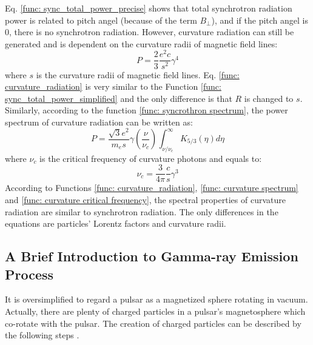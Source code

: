 \documentclass[12pt]{report}
\begin{document}
          Eq. \ref{func: sync_total_power_precise} shows that total synchrotron radiation power 
          is related to pitch angel (because of the term $B_\perp$), and if the pitch angel is $0$, there is 
          no synchrotron radiation. However, curvature radiation can still be generated and is dependent on 
          the curvature radii of magnetic field lines:
          \begin{equation}
            \label{func: curvature_radiation}
            P = \frac{2}{3}\frac{e^2c}{s^2}\gamma^4
          \end{equation}
          where $s$ is the curvature radii of magnetic field lines. 
          Eq. \ref{func: curvature_radiation} is very similar to the Function 
          \ref{func: sync_total_power_simplified} and the only difference is that $R$ is changed to $s$.
          Similarly, according to the function \ref{func: syncrothron spectrum}, 
          the power spectrum of curvature radiation can be written as:
          \begin{equation}
            \label{func: curvature spectrum}
            P = \frac{\sqrt{3}e^2}{m_es}\gamma \left(\frac{\nu}{\nu_c}\right) \int_{\nu / \nu_c}^{\infty} K_{5/3}\left(\eta \right)d\eta
          \end{equation}
          where $\nu_c$ is the critical frequency of curvature photons and equals to:
          \begin{equation}
            \label{func: curvature critical frequency}
            \nu_c = \frac{3}{4\pi}\frac{c}{s}\gamma^3
          \end{equation}
          According to Functions \ref{func: curvature_radiation}, \ref{func: curvature spectrum} and 
          \ref{func: curvature critical frequency}, the spectral properties of curvature radiation are  
          similar to synchrotron radiation. The only differences in the equations are particles' Lorentz 
          factors and curvature radii. 

        \subsection{A Brief Introduction to Gamma-ray Emission Process}
          It is oversimplified to regard a pulsar as a magnetized sphere rotating in vacuum. Actually,
          there are plenty of 
          charged particles in a pulsar's magnetosphere which co-rotate with the pulsar. The creation of 
          charged particles can 
          be described by the following steps \cite{Sturrock:1971zc}.
\end{document}
